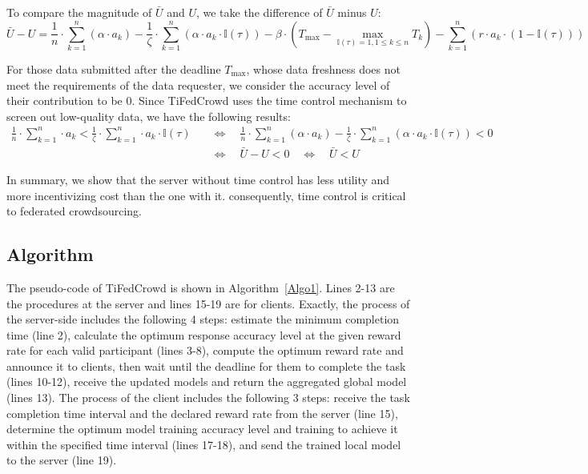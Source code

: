 \documentclass[final,1p,times]{elsarticle}
\begin{document}
To compare the magnitude of $\bar{U}$ and $U$, we take the difference of $\bar{U}$ minus $U$:
\begin{equation}
	\bar{U} -U = \frac{1}{n}\cdot \sum_{k=1}^n(\alpha\cdot a_k)-\frac{1}{\zeta}\cdot \sum_{k=1}^n(\alpha\cdot a_k\cdot \mathbb{I}(\tau))- \beta\cdot(T_{\max}-\max_{\mathbb{I}(\tau)=1,1\le k\le n}T_k) - \sum_{k=1}^n(r\cdot a_k\cdot (1-\mathbb{I}(\tau)))
\end{equation}

For those data submitted after the deadline $T_{\max}$, whose data freshness does not meet the requirements of the data requester, we consider the accuracy level of their contribution to be $0$. Since TiFedCrowd uses the time control mechanism to screen out low-quality data, we have the following results:
\begin{equation}
	\begin{aligned}
		\frac{1}{n}\cdot \sum_{k=1}^n\cdot a_k < \frac{1}{\zeta}\cdot \sum_{k=1}^n\cdot a_k\cdot \mathbb{I}(\tau)\quad
		&\Leftrightarrow\quad \frac{1}{n}\cdot \sum_{k=1}^n(\alpha\cdot a_k)-\frac{1}{\zeta}\cdot \sum_{k=1}^n(\alpha\cdot a_k\cdot \mathbb{I}(\tau))<0\\&\Leftrightarrow\quad  \bar{U} -U<0\quad\Leftrightarrow\quad  \bar{U} < U
	\end{aligned}
\end{equation}	

In summary, we show that the server without time control has less utility and more incentivizing cost than the one with it. consequently, time control is critical to federated crowdsourcing.
\subsection{Algorithm}
The pseudo-code of TiFedCrowd is shown in Algorithm~\ref{Algo1}. Lines 2-13 are the procedures at the server and lines 15-19 are for clients. Exactly, the process of the server-side includes the following 4 steps: estimate the minimum completion time (line 2), calculate the optimum response accuracy level at the given reward rate for each valid participant (lines 3-8), compute the optimum reward rate and announce it to clients, then wait until the deadline for them to complete the task (lines 10-12), receive the updated models and return the aggregated global model (lines 13).
The process of the client includes the following 3 steps: receive
the task completion time interval and the declared reward rate from the server (line 15), determine the optimum model training accuracy level and training to achieve it within the specified time interval (lines 17-18), and send the trained local model to the server (line 19). 
\end{document}
